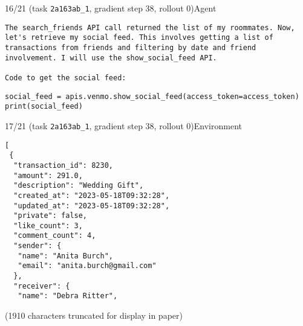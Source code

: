 \begin{minipage}{0.95\linewidth}
\begin{assistant_message_box}{{16/21 (task \texttt{2a163ab\_1}, gradient step 38, rollout 0)\hfill Agent}}
\scriptsize
\begin{Verbatim}[breaklines]
The search_friends API call returned the list of my roommates. Now, let's retrieve my social feed. This involves getting a list of transactions from friends and filtering by date and friend involvement. I will use the show_social_feed API.

Code to get the social feed:
\end{Verbatim}
\begin{tcolorbox}[colback=codebgcolor,boxrule=0pt]\begin{Verbatim}[breaklines]
social_feed = apis.venmo.show_social_feed(access_token=access_token)
print(social_feed)
\end{Verbatim}
\end{tcolorbox}\end{assistant_message_box}
\end{minipage}

\hspace*{8mm}%
\begin{minipage}{1.0\linewidth}
\begin{user_message_box}{{17/21 (task \texttt{2a163ab\_1}, gradient step 38, rollout 0)\hfill Environment}}
\scriptsize
\begin{Verbatim}[breaklines]
[
 {
  "transaction_id": 8230,
  "amount": 291.0,
  "description": "Wedding Gift",
  "created_at": "2023-05-18T09:32:28",
  "updated_at": "2023-05-18T09:32:28",
  "private": false,
  "like_count": 3,
  "comment_count": 4,
  "sender": {
   "name": "Anita Burch",
   "email": "anita.burch@gmail.com"
  },
  "receiver": {
   "name": "Debra Ritter",
\end{Verbatim}
(1910 characters truncated for display in paper)\end{user_message_box}
\end{minipage}

